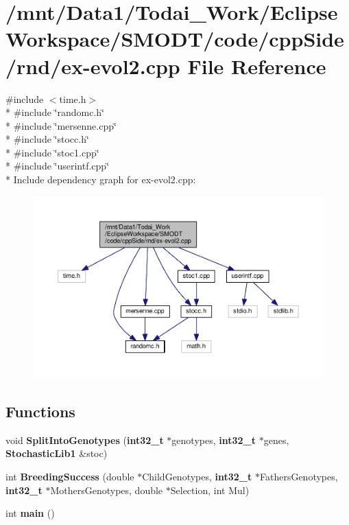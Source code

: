 \section{/mnt/\-Data1/\-Todai\-\_\-\-Work/\-Eclipse\-Workspace/\-S\-M\-O\-D\-T/code/cpp\-Side/rnd/ex-\/evol2.cpp File Reference}
\label{rnd_2ex-evol2_8cpp}
{\ttfamily \#include $<$time.\-h$>$}\\*
{\ttfamily \#include \char`\"{}randomc.\-h\char`\"{}}\\*
{\ttfamily \#include \char`\"{}mersenne.\-cpp\char`\"{}}\\*
{\ttfamily \#include \char`\"{}stocc.\-h\char`\"{}}\\*
{\ttfamily \#include \char`\"{}stoc1.\-cpp\char`\"{}}\\*
{\ttfamily \#include \char`\"{}userintf.\-cpp\char`\"{}}\\*
Include dependency graph for ex-\/evol2.cpp\-:
\nopagebreak
\begin{figure}[H]
\begin{center}
\leavevmode
\includegraphics[width=350pt]{rnd_2ex-evol2_8cpp__incl}
\end{center}
\end{figure}
\subsection*{Functions}
\begin{DoxyCompactItemize}
\item 
void {\bf Split\-Into\-Genotypes} ({\bf int32\-\_\-t} $\ast$genotypes, {\bf int32\-\_\-t} $\ast$genes, {\bf Stochastic\-Lib1} \&stoc)
\item 
int {\bf Breeding\-Success} (double $\ast$Child\-Genotypes, {\bf int32\-\_\-t} $\ast$Fathers\-Genotypes, {\bf int32\-\_\-t} $\ast$Mothers\-Genotypes, double $\ast$Selection, int Mul)
\item 
int {\bf main} ()
\end{DoxyCompactItemize}


